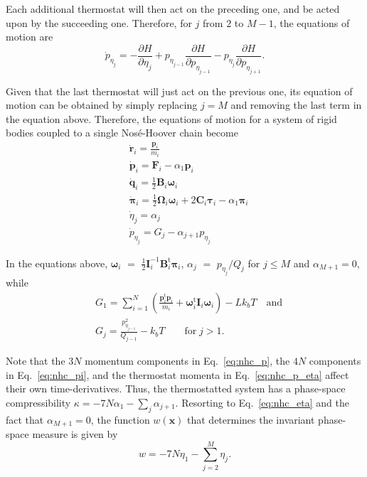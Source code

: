\documentclass[aip,jcp,reprint,amsmath,amssymb]{revtex4-1}
\newcommand{\mt}[1]{\boldsymbol{\mathbf{#1}}}           %
\newcommand{\vt}[1]{\boldsymbol{\mathbf{#1}}}           %
\newcommand{\tr}[1]{#1^\text{t}}                        %
\newcommand{\diff}[2]{\dfrac{\partial #1}{\partial #2}} %
\begin{document}
Each additional thermostat will then act on the preceding one, and be acted upon by the succeeding one. Therefore, for $j$ from $2$ to $M-1$, the equations of motion are
\[
{\dot p}_{\eta_j} = -\diff{H}{\eta_j} + p_{\eta_{j-1}} \diff{H}{p_{\eta_{j-1}}} - p_{\eta_j} \diff{H}{p_{\eta_{j+1}}}.
\]

Given that the last thermostat will just act on the previous one, its equation of motion can be obtained by simply replacing $j = M$ and removing the last term in the equation above. Therefore, the equations of motion for a system of rigid bodies coupled to a single Nos\'e-Hoover chain become
\begin{subequations}
\label{eq:nhc_system}
\begin{align}
&\dot{\vt r}_i = \frac{{\vt p}_i}{m_i} \\ 
&\dot{\vt p}_i = {\vt F}_i - \alpha_1 \vt p_i \label{eq:nhc_p} \\
&\dot{\vt q}_i = \frac{1}{2} \mt B_i \vt \omega_i \label{eq:nhc_q} \\
&\dot{\vt \pi}_i = \frac{1}{2} \mt \Omega_i \vt \omega_i + 2 \mt C_i \vt \tau_i - \alpha_1 \vt \pi_i \label{eq:nhc_pi} \\
&\dot{\eta}_j = \alpha_j \label{eq:nhc_eta} \\
&{\dot p}_{\eta_j} = G_j - \alpha_{j+1} p_{\eta_j}  \label{eq:nhc_p_eta}
\end{align}
\end{subequations}

In the equations above, ${\vt \omega}_i$ $=$ $\frac{1}{2} {\mt I}_i^{-1} \tr{\mt B}_i {\vt \pi}_i$, $\alpha_j$ $=$ ${p_{\eta_j}}/{Q_j}$ for $j \leq M$ and $\alpha_{M+1} = 0$, while
\begin{align*}
&G_1 = \sum_{i=1}^N \left( \frac{\tr{\vt p}_i{\vt p}_i}{m_i} + \tr{\vt \omega}_i \mt I_i \vt \omega_i \right) - L k_b T \quad \text{and}\\
&G_j = \frac{p_{\eta_{j-1}}^2}{Q_{j-1}} - k_b T \qquad \text{for} \; j > 1.
\end{align*}

Note that the $3N$ momentum components in Eq.~\eqref{eq:nhc_p}, the $4N$ components in Eq.~\eqref{eq:nhc_pi}, and the thermostat momenta in Eq.~\eqref{eq:nhc_p_eta} affect their own time-derivatives. Thus, the thermostatted system has a phase-space compressibility $\kappa = -7N \alpha_1 - \sum_j \alpha_{j+1}$. Resorting to Eq.~\eqref{eq:nhc_eta} and the fact that $\alpha_{M+1} = 0$, the function $w(\vt x)$ that determines the invariant phase-space measure is given by
\begin{equation}
\label{eq:nhc_measure}
w = -7N \eta_1 - \sum_{j=2}^M \eta_j.
\end{equation}
\end{document}

